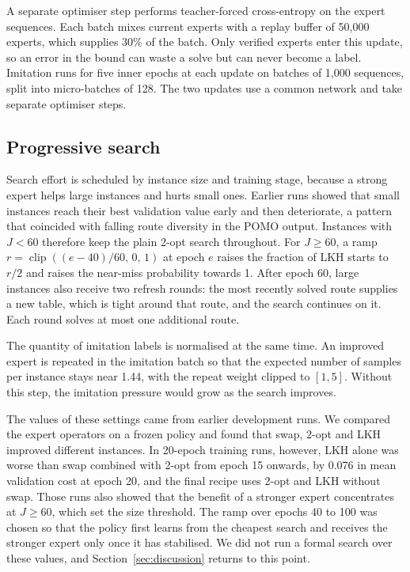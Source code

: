 \documentclass[preprint,12pt,authoryear]{elsarticle}
\begin{document}
A separate optimiser step performs teacher-forced cross-entropy on the expert sequences. Each batch mixes current experts with a replay buffer of 50,000 experts, which supplies 30\% of the batch. Only verified experts enter this update, so an error in the bound can waste a solve but can never become a label. Imitation runs for five inner epochs at each update on batches of 1,000 sequences, split into micro-batches of 128. The two updates use a common network and take separate optimiser steps.

\subsection{Progressive search}
\label{sec:recipe}

Search effort is scheduled by instance size and training stage, because a strong expert helps large instances and hurts small ones. Earlier runs showed that small instances reach their best validation value early and then deteriorate, a pattern that coincided with falling route diversity in the POMO output. Instances with $J < 60$ therefore keep the plain 2-opt search throughout. For $J \ge 60$, a ramp $r = \operatorname{clip}((e - 40)/60,\, 0,\, 1)$ at epoch $e$ raises the fraction of LKH starts to $r/2$ and raises the near-miss probability towards 1. After epoch 60, large instances also receive two refresh rounds: the most recently solved route supplies a new table, which is tight around that route, and the search continues on it. Each round solves at most one additional route.

The quantity of imitation labels is normalised at the same time. An improved expert is repeated in the imitation batch so that the expected number of samples per instance stays near 1.44, with the repeat weight clipped to $[1, 5]$. Without this step, the imitation pressure would grow as the search improves.

The values of these settings came from earlier development runs. We compared the expert operators on a frozen policy and found that swap, 2-opt and LKH improved different instances. In 20-epoch training runs, however, LKH alone was worse than swap combined with 2-opt from epoch 15 onwards, by 0.076 in mean validation cost at epoch 20, and the final recipe uses 2-opt and LKH without swap. Those runs also showed that the benefit of a stronger expert concentrates at $J \ge 60$, which set the size threshold. The ramp over epochs 40 to 100 was chosen so that the policy first learns from the cheapest search and receives the stronger expert only once it has stabilised. We did not run a formal search over these values, and Section~\ref{sec:discussion} returns to this point.
\end{document}
